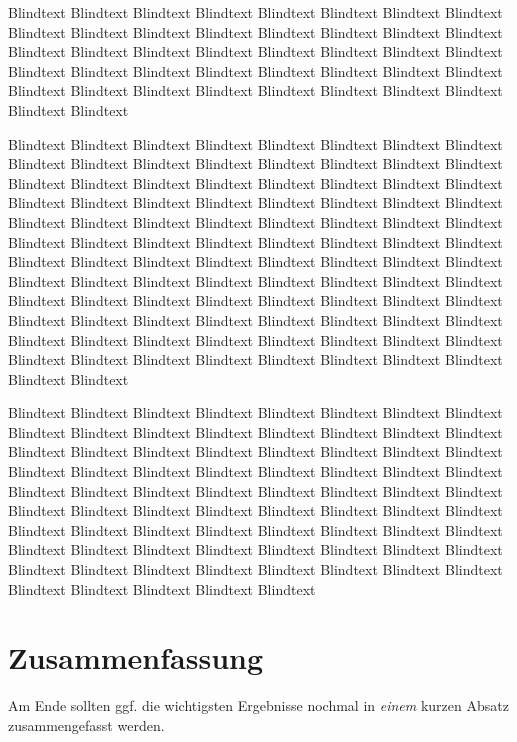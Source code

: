 Blindtext Blindtext Blindtext Blindtext Blindtext Blindtext Blindtext
Blindtext Blindtext Blindtext Blindtext Blindtext Blindtext Blindtext
Blindtext Blindtext Blindtext Blindtext Blindtext Blindtext Blindtext
Blindtext Blindtext Blindtext Blindtext Blindtext Blindtext Blindtext
Blindtext Blindtext Blindtext Blindtext Blindtext Blindtext Blindtext
Blindtext Blindtext Blindtext Blindtext Blindtext Blindtext Blindtext

Blindtext Blindtext Blindtext Blindtext Blindtext Blindtext Blindtext
Blindtext Blindtext Blindtext Blindtext Blindtext Blindtext Blindtext
Blindtext Blindtext Blindtext Blindtext Blindtext Blindtext Blindtext
Blindtext Blindtext Blindtext Blindtext Blindtext Blindtext Blindtext
Blindtext Blindtext Blindtext Blindtext Blindtext Blindtext Blindtext
Blindtext Blindtext Blindtext Blindtext Blindtext Blindtext Blindtext
Blindtext Blindtext Blindtext Blindtext Blindtext Blindtext Blindtext
Blindtext Blindtext Blindtext Blindtext Blindtext Blindtext Blindtext
Blindtext Blindtext Blindtext Blindtext Blindtext Blindtext Blindtext
Blindtext Blindtext Blindtext Blindtext Blindtext Blindtext Blindtext
Blindtext Blindtext Blindtext Blindtext Blindtext Blindtext Blindtext
Blindtext Blindtext Blindtext Blindtext Blindtext Blindtext Blindtext
Blindtext Blindtext Blindtext Blindtext Blindtext Blindtext Blindtext
Blindtext Blindtext Blindtext Blindtext Blindtext Blindtext Blindtext

Blindtext Blindtext Blindtext Blindtext Blindtext Blindtext Blindtext
Blindtext Blindtext Blindtext Blindtext Blindtext Blindtext Blindtext
Blindtext Blindtext Blindtext Blindtext Blindtext Blindtext Blindtext
Blindtext Blindtext Blindtext Blindtext Blindtext Blindtext Blindtext
Blindtext Blindtext Blindtext Blindtext Blindtext Blindtext Blindtext
Blindtext Blindtext Blindtext Blindtext Blindtext Blindtext Blindtext
Blindtext Blindtext Blindtext Blindtext Blindtext Blindtext Blindtext
Blindtext Blindtext Blindtext Blindtext Blindtext Blindtext Blindtext
Blindtext Blindtext Blindtext Blindtext Blindtext Blindtext Blindtext
Blindtext Blindtext Blindtext Blindtext Blindtext Blindtext Blindtext
Blindtext Blindtext Blindtext Blindtext Blindtext Blindtext Blindtext
\section{Zusammenfassung}
\label{ch:Analyse:sec:zusammenfassung}

Am Ende sollten ggf. die wichtigsten Ergebnisse nochmal in \emph{einem}
kurzen Absatz zusammengefasst werden.

